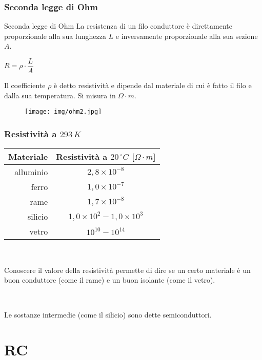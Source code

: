 \documentclass[]{beamer}
\theoremstyle{plain}
\begin{document}
\begin{frame}
\frametitle{Seconda legge di Ohm}
\begin{block}{Seconda legge di Ohm}
  La resistenza di un filo conduttore è direttamente proporzionale alla sua lunghezza $ L $ e inversamente proporzionale alla sua sezione $ A $.
  \begin{center}
    \colorbox{blue!30}{$ R = \rho \cdot \dfrac{L}{A} $}
  \end{center}
  Il coefficiente $ \rho $ è detto \alert{resistività} e dipende dal materiale di cui è fatto il filo e dalla sua temperatura. Si misura in $ \Omega \cdot m $.
\end{block}
\begin{figure}
  \texttt{[image: img/ohm2.jpg]}
\end{figure}
\end{frame}



\begin{frame}
\frametitle{Resistività a $ 293 \, K $}
\begin{table}[htb]\centering\footnotesize
  \begin{tabular}{rc}\toprule
  \textbf{Materiale} & \textbf{Resistività a $ 20\, ^\circ C$ [$ \Omega \cdot m $]}\\\midrule
  alluminio & $ 2,8 \times 10^{-8} $\\\addlinespace[1em] 
  ferro     & $ 1,0 \times 10^{-7} $\\\addlinespace[1em]
  rame      & $ 1,7 \times 10^{-8} $\\\addlinespace[1em]
  silicio   & $ 1,0 \times 10^{2}-1,0 \times 10^{3} $\\\addlinespace[1em]
  vetro     & $ 10^{10}-10^{14} $\\\bottomrule
  \end{tabular}
  \end{table}\pause

  ~

Conoscere il valore della resistività permette di dire se un certo materiale è un buon conduttore (come il rame) e un buon isolante (come il vetro).\pause

~

Le sostanze intermedie (come il silicio) sono dette \alert{semiconduttori}.
\end{frame}






\section{RC}
\end{document}
